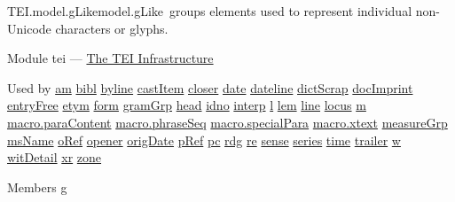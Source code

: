 \begin{reflist}
\item[]\begin{specHead}{TEI.model.gLike}{model.gLike} groups elements used to represent individual non-Unicode characters or glyphs.\end{specHead} 
    \item[{Module}]
  tei — \hyperref[ST]{The TEI Infrastructure}
    \item[{Used by}]
  \hyperref[TEI.am]{am} \hyperref[TEI.bibl]{bibl} \hyperref[TEI.byline]{byline} \hyperref[TEI.castItem]{castItem} \hyperref[TEI.closer]{closer} \hyperref[TEI.date]{date} \hyperref[TEI.dateline]{dateline} \hyperref[TEI.dictScrap]{dictScrap} \hyperref[TEI.docImprint]{docImprint} \hyperref[TEI.entryFree]{entryFree} \hyperref[TEI.etym]{etym} \hyperref[TEI.form]{form} \hyperref[TEI.gramGrp]{gramGrp} \hyperref[TEI.head]{head} \hyperref[TEI.idno]{idno} \hyperref[TEI.interp]{interp} \hyperref[TEI.l]{l} \hyperref[TEI.lem]{lem} \hyperref[TEI.line]{line} \hyperref[TEI.locus]{locus} \hyperref[TEI.m]{m} \hyperref[TEI.macro.paraContent]{macro.paraContent} \hyperref[TEI.macro.phraseSeq]{macro.phraseSeq} \hyperref[TEI.macro.specialPara]{macro.specialPara} \hyperref[TEI.macro.xtext]{macro.xtext} \hyperref[TEI.measureGrp]{measureGrp} \hyperref[TEI.msName]{msName} \hyperref[TEI.oRef]{oRef} \hyperref[TEI.opener]{opener} \hyperref[TEI.origDate]{origDate} \hyperref[TEI.pRef]{pRef} \hyperref[TEI.pc]{pc} \hyperref[TEI.rdg]{rdg} \hyperref[TEI.re]{re} \hyperref[TEI.sense]{sense} \hyperref[TEI.series]{series} \hyperref[TEI.time]{time} \hyperref[TEI.trailer]{trailer} \hyperref[TEI.w]{w} \hyperref[TEI.witDetail]{witDetail} \hyperref[TEI.xr]{xr} \hyperref[TEI.zone]{zone}
    \item[{Members}]
  \hyperref[TEI.g]{g}
\end{reflist}  
